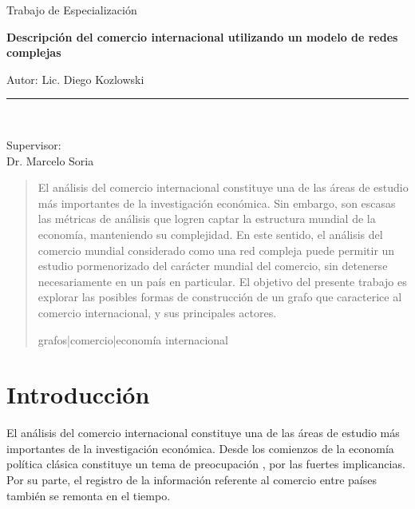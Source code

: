 \documentclass[runningheads,a4paper]{llncs}
\newcommand{\keywords}[1]{\par\addvspace\baselineskip
\noindent\keywordname\enspace\ignorespaces#1}
\begin{document}
\begin{titlepage}
\begin{center}
\begin{large}
Trabajo de Especialización\\
\end{large}
\vspace*{0.2in}
\begin{Large}
\textbf{Descripción del comercio internacional utilizando un modelo de redes complejas} \\
\end{Large}
\vspace*{0.25in}
\begin{large}
Autor: Lic. Diego Kozlowski\\
\end{large}
\vspace*{0.3in}
\rule{80mm}{0.1mm}\\
\vspace*{0.1in}
\begin{large}
Supervisor: \\
Dr. Marcelo Soria \\
\end{large}
\end{center}

\end{titlepage}

\tableofcontents


\break



\begin{abstract}
El análisis del comercio internacional constituye una de las áreas de estudio más importantes de la investigación económica. Sin embargo, son escasas las métricas de análisis que logren captar la estructura mundial de la economía, manteniendo su complejidad. En este sentido, el análisis del comercio mundial considerado como una red compleja puede permitir un estudio pormenorizado del carácter mundial del comercio, sin detenerse necesariamente en un país en particular. El objetivo del presente trabajo es explorar las posibles formas de construcción de un grafo que caracterice al comercio internacional, y sus principales actores.

\keywords{grafos|comercio|economía internacional}
\end{abstract}


\section{Introducción}

El análisis del comercio internacional constituye una de las áreas de estudio más importantes de la investigación económica. Desde los comienzos de la economía política clásica constituye un tema de preocupación \cite{ricardo1987principios}, por las fuertes implicancias. Por su parte, el registro de la información referente al comercio entre países también se remonta en el tiempo.          
\end{document}
